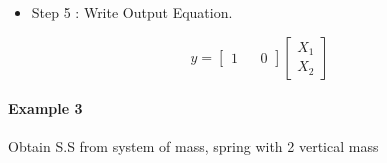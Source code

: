 \begin{itemize}
	\item Step 5 : Write Output Equation.
\end{itemize}
\[
y =
\begin{bmatrix}
	1 &   & 0 
\end{bmatrix}
\begin{bmatrix}
	X_1 \\
	X_2 
\end{bmatrix}
\]


\paragraph{Example 3} Obtain S.S from system of mass, spring with 2 vertical mass

\begin{figure}[h]
	\centering
	
\end{figure}


